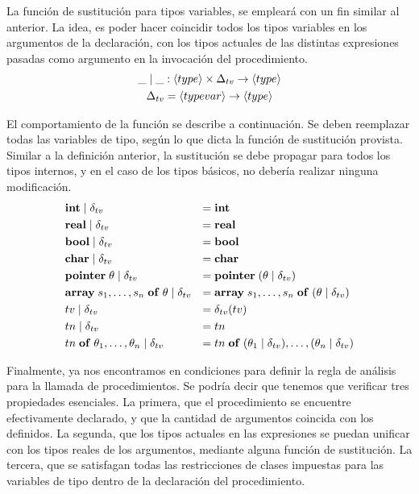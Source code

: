 \documentclass{article}
\begin{document}
La función de sustitución para tipos variables, se empleará con un fin similar al anterior.
La idea, es poder hacer coincidir todos los tipos variables en los argumentos de la declaración, con los tipos actuales de las distintas expresiones pasadas como argumento en la invocación del procedimiento.
\begin{gather*}
\_ \mid \_ : \langle type \rangle \times \Delta_{tv} \rightarrow \langle type \rangle
\\
\Delta_{tv} = \langle typevar \rangle \rightarrow \langle type \rangle
\end{gather*}

El comportamiento de la función se describe a continuación.
Se deben reemplazar todas las variables de tipo, según lo que dicta la función de sustitución provista.
Similar a la definición anterior, la sustitución se debe propagar para todos los tipos internos, y en el caso de los tipos básicos, no debería realizar ninguna modificación.
\begin{align*}
&\mathbf{int} \mid \delta_{tv}
&=&\;
\mathbf{int}
\\
&\mathbf{real} \mid \delta_{tv}
&=&\;
\mathbf{real}
\\
&\mathbf{bool} \mid \delta_{tv}
&=&\;
\mathbf{bool}
\\
&\mathbf{char} \mid \delta_{tv}
&=&\;
\mathbf{char}
\\
&\mathbf{pointer} \; \theta \mid \delta_{tv}
&=&\;
\mathbf{pointer} \; (\theta \mid \delta_{tv})
\\
&\mathbf{array} \; s_1, \ldots, s_n \; \mathbf{of} \; \theta \mid \delta_{tv}
&=&\;
\mathbf{array} \; s_1, \ldots, s_n \; \mathbf{of} \; (\theta \mid \delta_{tv})
\\
&tv \mid \delta_{tv}
&=&\;
\delta_{tv}(tv)
\\
&tn \mid \delta_{tv}
&=&\;
tn
\\
&tn \; \mathbf{of} \; \theta_1, \ldots, \theta_n \mid \delta_{tv}
&=&\;
tn \; \mathbf{of} \; (\theta_1 \mid \delta_{tv}), \ldots, (\theta_n \mid \delta_{tv})
\end{align*}

Finalmente, ya nos encontramos en condiciones para definir la regla de análisis para la llamada de procedimientos.
Se podría decir que tenemos que verificar tres propiedades esenciales.
La primera, que el procedimiento se encuentre efectivamente declarado, y que la cantidad de argumentos coincida con los definidos.
La segunda, que los tipos actuales en las expresiones se puedan unificar con los tipos reales de los argumentos, mediante alguna función de sustitución.
La tercera, que se satisfagan todas las restricciones de clases impuestas para las variables de tipo dentro de la declaración del procedimiento.
\end{document}
